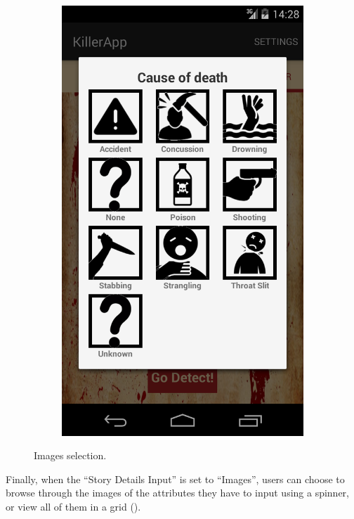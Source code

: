 \documentclass{mproj}
\begin{document}
\begin{figure}[h]
\begin{subfigure}{0.25\textwidth}
		\includegraphics[width=\textwidth]{images/grid_selector}
	\end{subfigure}			
	\caption{Images selection.}
	\label{fig:images_selection}
\end{figure}

Finally, when the ``Story Details Input'' is set to ``Images'', users can choose to browse through the images of the attributes they have to input using a spinner, or view all of them in a grid ().
\end{document}
